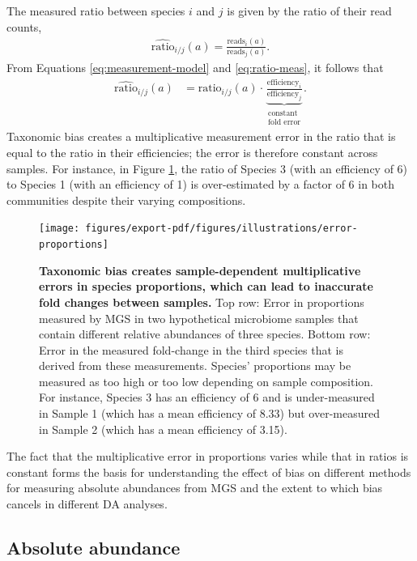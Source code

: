 \documentclass[
]{article}
\begin{document}
The measured ratio between species \(i\) and \(j\) is given by the ratio of their read counts,
\begin{align}
  \label{eq:ratio-meas}
  \widehat{\text{ratio}}_{i/j}(a) = \frac{\text{reads}_i(a)}{\text{reads}_j(a)}.
\end{align}
From Equations \eqref{eq:measurement-model} and \eqref{eq:ratio-meas}, it follows that
\begin{align}
  \label{eq:ratio-error}
  \widehat{\text{ratio}}_{i/j}(a)
  &= \text{ratio}_{i/j}(a) \cdot \underbrace{\frac{\text{efficiency}_{i}}{\text{efficiency}_{j}}}_{\substack{\text{constant} \\ \text{fold error}}}.
\end{align}
Taxonomic bias creates a multiplicative measurement error in the ratio that is equal to the ratio in their efficiencies; the error is therefore constant across samples.
For instance, in Figure \ref{fig:error-proportions}, the ratio of Species 3 (with an efficiency of 6) to Species 1 (with an efficiency of 1) is over-estimated by a factor of 6 in both communities despite their varying compositions.

\begin{figure}
\texttt{[image: figures/export-pdf/figures/illustrations/error-proportions]} \caption{\textbf{Taxonomic bias creates sample-dependent multiplicative errors in species proportions, which can lead to inaccurate fold changes between samples.} Top row: Error in proportions measured by MGS in two hypothetical microbiome samples that contain different relative abundances of three species. Bottom row: Error in the measured fold-change in the third species that is derived from these measurements. Species' proportions may be measured as too high or too low depending on sample composition. For instance, Species 3 has an efficiency of 6 and is under-measured in Sample 1 (which has a mean efficiency of 8.33) but over-measured in Sample 2 (which has a mean efficiency of 3.15).}\label{fig:error-proportions}
\end{figure}



The fact that the multiplicative error in proportions varies while that in ratios is constant forms the basis for understanding the effect of bias on different methods for measuring absolute abundances from MGS and the extent to which bias cancels in different DA analyses.

\hypertarget{absolute-abundance}{%
\subsection{Absolute abundance}\label{absolute-abundance}}
\end{document}
